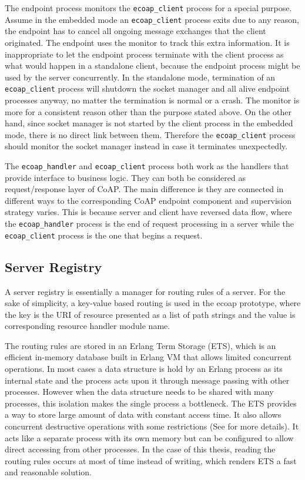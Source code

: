 The endpoint process monitors the \verb|ecoap_client| process for a special purpose. Assume in the embedded mode an \verb|ecoap_client| process exits due to any reason, the endpoint has to cancel all ongoing message exchanges that the client originated. The endpoint uses the monitor to track this extra information. It is inappropriate to let the endpoint process terminate with the client process as what would happen in a standalone client, because the endpoint process might be used by the server concurrently. In the standalone mode, termination of an \verb|ecoap_client| process will shutdown the socket manager and all alive endpoint processes anyway, no matter the termination is normal or a crash. The monitor is more for a consistent reason other than the purpose stated above. On the other hand, since socket manager is not started by the client process in the embedded mode, there is no direct link between them. Therefore the \verb|ecoap_client| process should monitor the socket manager instead in case it terminates unexpectedly.

The \verb|ecoap_handler| and \verb|ecoap_client| process both work as the handlers that provide interface to business logic. They can both be considered as request/response layer of CoAP. The main difference is they are connected in different ways to the corresponding CoAP endpoint component and supervision strategy varies. This is because server and client have reversed data flow, where the \verb|ecoap_handler| process is the end of request processing in a server while the \verb|ecoap_client| process is the one that begins a request.

\subsection{Server Registry}\label{coap_registry}

A server registry is essentially a manager for routing rules of a server. For the sake of simplicity, a key-value based routing is used in the ecoap prototype, where the key is the URI of resource presented as a list of path strings and the value is corresponding resource handler module name. 

The routing rules are stored in an Erlang Term Storage (ETS), which is an efficient in-memory database built in Erlang VM that allows limited concurrent operations. In most cases a data structure is hold by an Erlang process as its internal state and the process acts upon it through message passing with other processes. However when the data structure needs to be shared with many processes, this isolation makes the single process a bottleneck. The ETS provides a way to store large amount of data with constant access time. It also allows concurrent destructive operations with some restrictions (See \autocite{ets} for more details). It acts like a separate process with its own memory but can be configured to allow direct accessing from other processes. In the case of this thesis, reading the routing rules occurs at most of time instead of writing, which renders ETS a fast and reasonable solution. 

